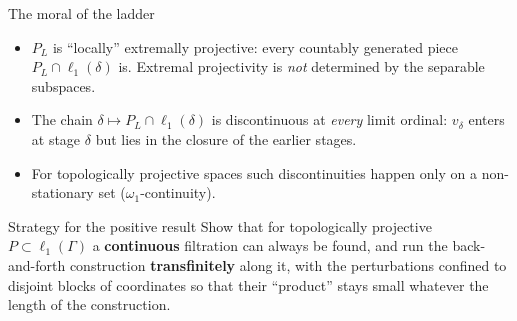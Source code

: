 \documentclass[10pt,aspectratio=169]{beamer}
\newcommand{\ellone}[1]{\ell_1(#1)}
\begin{document}
\begin{frame}{The moral of the ladder}
  \begin{itemize}
    \item $P_L$ is ``locally'' extremally projective: every countably generated
      piece $P_L\cap\ellone\delta$ is. Extremal projectivity is \emph{not}
      determined by the separable subspaces.
    \item The chain $\delta\mapsto P_L\cap\ellone\delta$ is discontinuous at
      \emph{every} limit ordinal: $v_\delta$ enters at stage $\delta$ but lies in
      the closure of the earlier stages.
    \item For topologically projective spaces such discontinuities happen only
      on a non-stationary set ($\omega_1$-continuity).
  \end{itemize}
  \bigskip
  \begin{alertblock}{Strategy for the positive result}
    Show that for topologically projective $P\subset\ellone\Gamma$ a
    \textbf{continuous} filtration can always be found, and run the
    back-and-forth construction \textbf{transfinitely} along it, with the
    perturbations confined to disjoint blocks of coordinates so that their
    ``product'' stays small whatever the length of the construction.
  \end{alertblock}
\end{frame}
\end{document}
